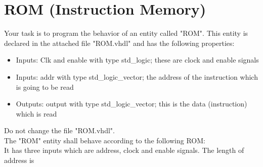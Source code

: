 \documentclass[a4paper,12pt]{article}
\begin{document}
\pagestyle{empty}
\setlength{\parindent}{0em} 
\section*{ROM (Instruction Memory)}


Your task is to program the behavior of an entity called "ROM". This entity is declared in the attached file "ROM.vhdl" and has the following properties:
\begin{itemize}
\item Inputs: Clk and enable with type std\_logic; these are clock and enable signals
\item Inputs: addr with type std\_logic\_vector; the address of the instruction which is going to be read
\item Outputs: output with type std\_logic\_vector; this is the data (instruction) which is read 
\end{itemize}
\vspace{0.3cm}
\begin{center}
\end{center}

Do not change the file "ROM.vhdl".\\

The "ROM" entity shall behave according to the following ROM:\\

It has three inputs which are address, clock and enable signals. The length of address is %
\end{document}
